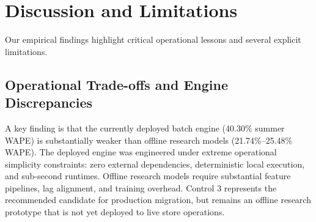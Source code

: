 \documentclass[conference]{IEEEtran}
\begin{document}
\section{Discussion and Limitations}
Our empirical findings highlight critical operational lessons and several explicit limitations.

\subsection{Operational Trade-offs and Engine Discrepancies}
A key finding is that the currently deployed batch engine (40.30\% summer WAPE) is substantially weaker than offline research models (21.74\%--25.48\% WAPE). The deployed engine was engineered under extreme operational simplicity constraints: zero external dependencies, deterministic local execution, and sub-second runtimes. Offline research models require substantial feature pipelines, lag alignment, and training overhead. Control 3 represents the recommended candidate for production migration, but remains an offline research prototype that is not yet deployed to live store operations.
\end{document}
